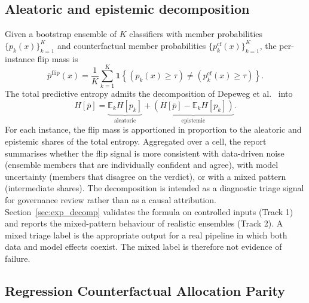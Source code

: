 \documentclass[acmsmall,nonacm,review,anonymous]{acmart}
\newcommand{\E}{\mathbb{E}}
\newcommand{\1}[1]{\mathbf{1}\!\left\{#1\right\}}
\begin{document}
\subsection{Aleatoric and epistemic decomposition}\label{sec:decomposition}

Given a bootstrap ensemble of $K$ classifiers with member probabilities $\{p_k(x)\}_{k=1}^K$ and counterfactual member probabilities $\{p_k^{\mathrm{cf}}(x)\}_{k=1}^K$, the per-instance flip mass is
\begin{equation}
\bar{p}^{\mathrm{flip}}(x) = \frac{1}{K} \sum_{k = 1}^{K} \1{(p_k(x) \ge \tau) \ne (p_k^{\mathrm{cf}}(x) \ge \tau)}.
\end{equation}
The total predictive entropy admits the decomposition of Depeweg et al.\ \cite{depeweg2018} into
\begin{equation}
H[\bar p] = \underbrace{\E_k H[p_k]}_{\text{aleatoric}} + \underbrace{(H[\bar p] - \E_k H[p_k])}_{\text{epistemic}}.
\end{equation}
For each instance, the flip mass is apportioned in proportion to the aleatoric and epistemic shares of the total entropy. Aggregated over a cell, the report summarises whether the flip signal is more consistent with data-driven noise (ensemble members that are individually confident and agree), with model uncertainty (members that disagree on the verdict), or with a mixed pattern (intermediate shares). The decomposition is intended as a diagnostic triage signal for governance review rather than as a causal attribution. Section~\ref{sec:exp_decomp} validates the formula on controlled inputs (Track 1) and reports the mixed-pattern behaviour of realistic ensembles (Track 2). A mixed triage label is the appropriate output for a real pipeline in which both data and model effects coexist. The mixed label is therefore not evidence of failure.

\subsection{Regression Counterfactual Allocation Parity}\label{sec:rcap}
\end{document}
